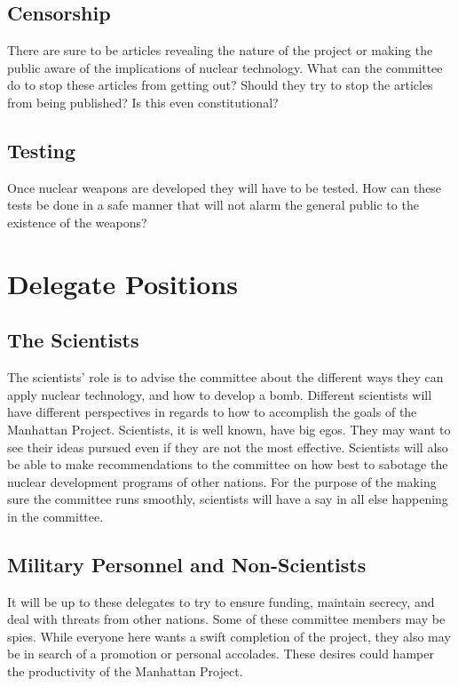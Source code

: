 \documentclass[11 pt, twoside]{article}
\begin{document}
\subsection{Censorship}
There are sure to be articles revealing the nature of the project or making the public aware of the implications of nuclear technology. What can the committee do to stop these articles from getting out? Should they try to stop the articles from being published? Is this even constitutional? 

\subsection{Testing}
Once nuclear weapons are developed they will have to be tested. How can these tests be done in a safe manner that will not alarm the general public to the existence of the weapons?

\section{Delegate Positions}

\subsection{The Scientists}
The scientists’ role is to advise the committee about the different ways they can apply nuclear technology, and how to develop a bomb. Different scientists will have different perspectives in regards to how to accomplish the goals of the Manhattan Project. Scientists, it is well known, have big egos. They may want to see their ideas pursued even if they are not the most effective. Scientists will also be able to make recommendations to the committee on how best to sabotage the nuclear development programs of other nations. For the purpose of the making sure the committee runs smoothly, scientists will  have a say in all else happening in the committee.

\subsection{Military Personnel and Non-Scientists}
It will be up to these delegates to try to ensure funding, maintain secrecy, and deal with threats from other nations. Some of these committee members may be spies. While everyone here wants  a swift completion of the project, they also may be in search of a promotion or personal accolades. These desires could hamper the productivity of the Manhattan Project. 
\end{document}

